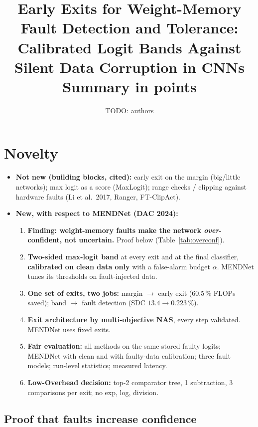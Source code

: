 \documentclass[10pt,a4paper]{article}
\title{Early Exits for Weight-Memory Fault Detection and Tolerance:\\
Calibrated Logit Bands Against Silent Data Corruption in CNNs\\[4pt]
\large Summary in points}
\author{TODO: authors}
\date{}
\begin{document}
\maketitle

\section{Novelty}

\begin{itemize}
  \item \textbf{Not new (building blocks, cited):} early exit on the margin (big/little networks); max logit as a
        score (MaxLogit); range checks / clipping against hardware faults (Li et al.\ 2017, Ranger, FT-ClipAct).
  \item \textbf{New, with respect to MENDNet (DAC 2024):}
  \begin{enumerate}
    \item \textbf{Finding: weight-memory faults make the network \emph{over}-confident, not uncertain.}
          Proof below (Table~\ref{tab:overconf}).
    \item \textbf{Two-sided max-logit band} at every exit and at the final classifier, \textbf{calibrated on clean
          data only} with a false-alarm budget $\alpha$. MENDNet tunes its thresholds on fault-injected data.
    \item \textbf{One set of exits, two jobs:} margin $\to$ early exit ($60.5\,\%$ FLOPs saved); band $\to$
          fault detection (SDC $13.4 \to 0.223\,\%$).
    \item \textbf{Exit architecture by multi-objective NAS}, every step validated. MENDNet uses fixed exits.
    \item \textbf{Fair evaluation:} all methods on the same stored faulty logits; MENDNet with clean and with
          faulty-data calibration; three fault models; run-level statistics; measured latency.
    \item \textbf{Low-Overhead decision:} top-2 comparator tree, 1 subtraction, 3 comparisons per exit; no exp, log,
          division.
  \end{enumerate}
\end{itemize}

\subsection*{Proof that faults increase confidence}
\end{document}
